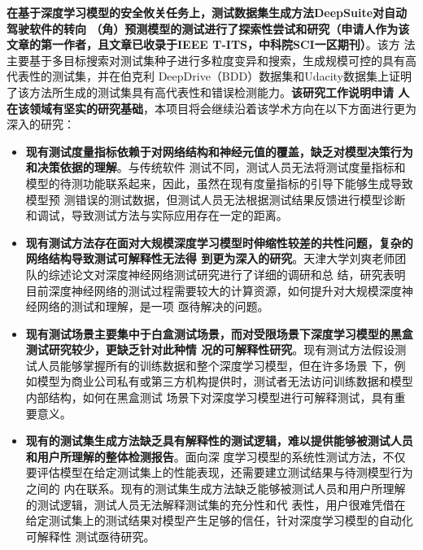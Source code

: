 \textbf{在基于深度学习模型的安全攸关任务上，测试数据集生成方法DeepSuite对自动驾驶软件的转向
	（角）预测模型的测试进行了探索性尝试和研究（申请人作为该文章的第一作者，且文章已收录于IEEE T-ITS，中科院SCI一区期刊）}。该方
法主要基于多目标搜索对测试集种子进行多粒度变异和搜索，生成规模可控的具有高代表性的测试集，并在伯克利
DeepDrive（BDD）数据集和Udacity数据集上证明了该方法所生成的测试集具有高代表性和错误检测能力。\textbf{该研究工作说明申请
	人在该领域有坚实的研究基础}，本项目将会继续沿着该学术方向在以下方面进行更为深入的研究：
\begin{itemize}
	\item \textbf{现有测试度量指标依赖于对网络结构和神经元值的覆盖，缺乏对模型决策行为和决策依据的理解}。与传统软件
	      测试不同，测试人员无法将测试度量指标和模型的待测功能联系起来，因此，虽然在现有度量指标的引导下能够生成导致模型预
	      测错误的测试数据，但测试人员无法根据测试结果反馈进行模型诊断和调试，导致测试方法与实际应用存在一定的距离。
	\item \textbf{现有测试方法存在面对大规模深度学习模型时伸缩性较差的共性问题，复杂的网络结构导致测试可解释性无法得
		      到更为深入的研究}。天津大学刘爽老师团队的综述论文对深度神经网络测试研究进行了详细的调研和总
	      结，研究表明目前深度神经网络的测试过程需要较大的计算资源，如何提升对大规模深度神经网络的测试和理解，是一项
	      亟待解决的问题。
	\item \textbf{现有测试场景主要集中于白盒测试场景，而对受限场景下深度学习模型的黑盒测试研究较少，更缺乏针对此种情
		      况的可解释性研究}。现有测试方法假设测试人员能够掌握所有的训练数据和整个深度学习模型，但在许多场景
	      下，例如模型为商业公司私有或第三方机构提供时，测试者无法访问训练数据和模型内部结构，如何在黑盒测试
	      场景下对深度学习模型进行可解释测试，具有重要意义。
	\item \textbf{现有的测试集生成方法缺乏具有解释性的测试逻辑，难以提供能够被测试人员和用户所理解的整体检测报告}。面向深
	      度学习模型的系统性测试方法，不仅要评估模型在给定测试集上的性能表现，还需要建立测试结果与待测模型行为之间的
	      内在联系。现有的测试集生成方法缺乏能够被测试人员和用户所理解的测试逻辑，测试人员无法解释测试集的充分性和代
	      表性，用户很难凭借在给定测试集上的测试结果对模型产生足够的信任，针对深度学习模型的自动化可解释性
	      测试亟待研究。
\end{itemize}




\begin{spacing}{1.3} %
	 \songti
	
	
	\vspace{11bp}
\end{spacing}
